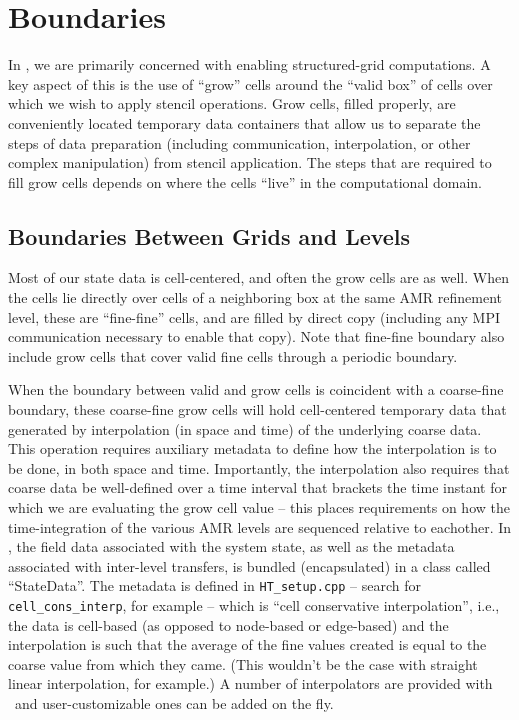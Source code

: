 \section{Boundaries}
In \amrex, we are primarily concerned with enabling structured-grid
computations.  A key aspect of this is the use of ``grow'' cells
around the ``valid box'' of cells over which we wish to apply stencil operations.
Grow cells, filled properly, are conveniently located temporary 
data containers that allow us to separate the steps of data preparation
(including communication, interpolation, or other complex manipulation)
from stencil application.  The steps that are required to fill grow cells
depends on where the cells ``live'' in the computational domain.

\subsection{Boundaries Between Grids and Levels}
Most of our state data is cell-centered, and often the grow cells are
as well.  When the cells lie directly over cells of a neighboring box
at the same AMR refinement level, these are ``fine-fine'' cells, and are
filled by direct copy (including any MPI communication necessary to enable
that copy).  Note that fine-fine boundary also include grow cells that
cover valid fine cells through a periodic boundary.

When the boundary between valid and grow cells is coincident
with a coarse-fine boundary, these coarse-fine grow cells will hold cell-centered 
temporary data that generated by interpolation (in space and time) of the
underlying coarse data.  This operation requires auxiliary metadata to define 
how the interpolation is to be done, in both space and time.  Importantly,
the interpolation also requires that coarse data be well-defined over
a time interval that brackets the time instant for which we are evaluating
the grow cell value  -- this places requirements on how the time-integration 
of the various AMR levels are sequenced relative to eachother.
In \amrex, the field data associated with the system state, as well as the metadata
associated with inter-level transfers, is bundled (encapsulated) in
a class called ``StateData''.  The metadata 
is defined in {\tt HT\_setup.cpp} -- search for
{\tt cell\_cons\_interp}, for example -- which is ``cell conservative
interpolation'', i.e., the data is cell-based (as opposed to node-based
or edge-based) and the interpolation is such that the average of the
fine values created is equal to the coarse value from which they came.
(This wouldn't be the case with straight linear interpolation, for
example.)  A number of interpolators are provided with \amrex\ and 
user-customizable ones can be added on the fly.

